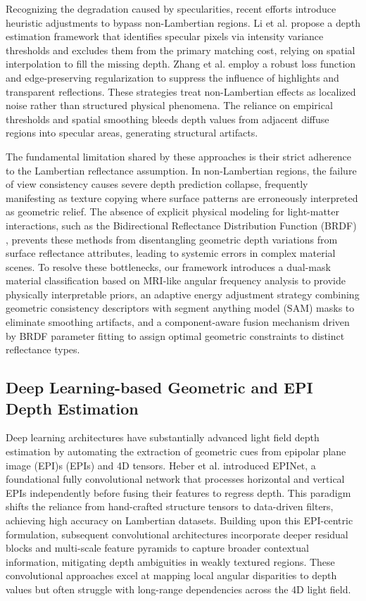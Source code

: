 \documentclass[lettersize,journal]{IEEEtran}
\begin{document}
Recognizing the degradation caused by specularities, recent efforts introduce heuristic adjustments to bypass non-Lambertian regions. Li et al. \cite{li2021} propose a depth estimation framework that identifies specular pixels via intensity variance thresholds and excludes them from the primary matching cost, relying on spatial interpolation to fill the missing depth. Zhang et al. \cite{zhang2023} employ a robust loss function and edge-preserving regularization to suppress the influence of highlights and transparent reflections. These strategies treat non-Lambertian effects as localized noise rather than structured physical phenomena. The reliance on empirical thresholds and spatial smoothing bleeds depth values from adjacent diffuse regions into specular areas, generating structural artifacts.

The fundamental limitation shared by these approaches is their strict adherence to the Lambertian reflectance assumption. In non-Lambertian regions, the failure of view consistency causes severe depth prediction collapse, frequently manifesting as texture copying where surface patterns are erroneously interpreted as geometric relief. The absence of explicit physical modeling for light-matter interactions, such as the Bidirectional Reflectance Distribution Function (BRDF) \cite{blinn1977}, prevents these methods from disentangling geometric depth variations from surface reflectance attributes, leading to systemic errors in complex material scenes. To resolve these bottlenecks, our framework introduces a dual-mask material classification based on MRI-like angular frequency analysis to provide physically interpretable priors, an adaptive energy adjustment strategy combining geometric consistency descriptors with segment anything model (SAM) masks to eliminate smoothing artifacts, and a component-aware fusion mechanism driven by BRDF parameter fitting to assign optimal geometric constraints to distinct reflectance types.

\subsection{Deep Learning-based Geometric and EPI Depth Estimation}

Deep learning architectures have substantially advanced light field depth estimation by automating the extraction of geometric cues from epipolar plane image (EPI)s (EPIs) and 4D tensors. Heber et al. \cite{heber2018} introduced EPINet, a foundational fully convolutional network that processes horizontal and vertical EPIs independently before fusing their features to regress depth. This paradigm shifts the reliance from hand-crafted structure tensors to data-driven filters, achieving high accuracy on Lambertian datasets. Building upon this EPI-centric formulation, subsequent convolutional architectures \cite{lyu2022} incorporate deeper residual blocks \cite{he2016} and multi-scale feature pyramids \cite{lin2017} to capture broader contextual information, mitigating depth ambiguities in weakly textured regions. These convolutional approaches excel at mapping local angular disparities to depth values but often struggle with long-range dependencies across the 4D light field.
\end{document}
